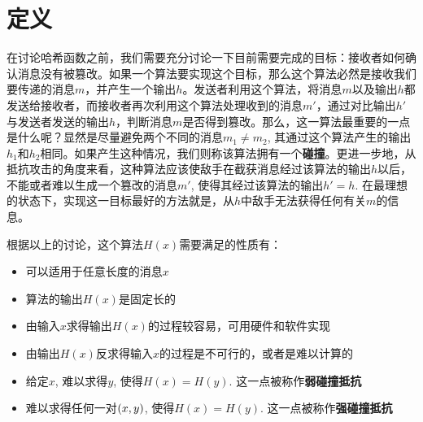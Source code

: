 \section{定义}
在讨论哈希函数之前，我们需要充分讨论一下目前需要完成的目标：接收者如何确认消息没有被篡改。如果一个算法要实现这个目标，那么这个算法必然是接收我们要传递的消息$m$，并产生一个输出$h$。发送者利用这个算法，将消息$m$以及输出$h$都发送给接收者，而接收者再次利用这个算法处理收到的消息$m'$，通过对比输出$h'$与发送者发送的输出$h$，判断消息$m$是否得到篡改。那么，这一算法最重要的一点是什么呢？显然是尽量避免两个不同的消息$m_1\neq m_2$, 其通过这个算法产生的输出$h_1$和$h_2$相同。如果产生这种情况，我们则称该算法拥有一个\textbf{碰撞}。更进一步地，从抵抗攻击的角度来看，这种算法应该使敌手在截获消息经过该算法的输出$h$以后，不能或者难以生成一个篡改的消息$m'$, 使得其经过该算法的输出$h'=h$. 在最理想的状态下，实现这一目标最好的方法就是，从$h$中敌手无法获得任何有关$m$的信息。\par
根据以上的讨论，这个算法$H(x)$需要满足的性质有：
\begin{itemize}
	\item 可以适用于任意长度的消息$x$
	\item 算法的输出$H(x)$是固定长的
	\item 由输入$x$求得输出$H(x)$的过程较容易，可用硬件和软件实现
	\item 由输出$H(x)$反求得输入$x$的过程是不可行的，或者是难以计算的
	\item 给定$x$, 难以求得$y$, 使得$H(x)=H(y)$. 这一点被称作\textbf{弱碰撞抵抗}
	\item 难以求得任何一对$\left( {x, y}\right)$, 使得$H(x)=H(y)$. 这一点被称作\textbf{强碰撞抵抗}
\end{itemize}

